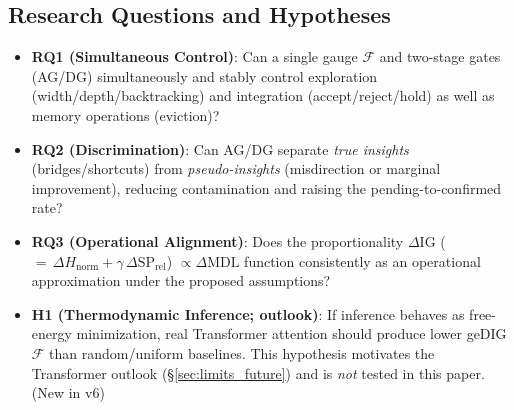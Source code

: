 \documentclass[12pt]{article}
\newcommand{\F}{\mathcal{F}}
\begin{document}
\subsection*{Research Questions and Hypotheses}
\begin{itemize}[leftmargin=1.4em]
  \item \textbf{RQ1 (Simultaneous Control)}: Can a single gauge $\F$ and two-stage gates (AG/DG) simultaneously and stably control exploration (width/depth/backtracking) and integration (accept/reject/hold) as well as memory operations (eviction)?
  \item \textbf{RQ2 (Discrimination)}: Can AG/DG separate \emph{true insights} (bridges/shortcuts) from \emph{pseudo-insights} (misdirection or marginal improvement), reducing contamination and raising the pending-to-confirmed rate?
  \item \textbf{RQ3 (Operational Alignment)}: Does the proportionality $\Delta\mathrm{IG}$ ($=\,\Delta H_{\mathrm{norm}}+\gamma\,\Delta\mathrm{SP}_{\mathrm{rel}}$) $\propto \Delta\mathrm{MDL}$ function consistently as an operational approximation under the proposed assumptions?
  \item \textbf{H1 (Thermodynamic Inference; outlook)}: If inference behaves as free-energy minimization, real Transformer attention should produce lower geDIG $\F$ than random/uniform baselines. This hypothesis motivates the Transformer outlook (\S\ref{sec:limits_future}) and is \emph{not} tested in this paper. (New in v6)
\end{itemize}
\end{document}
